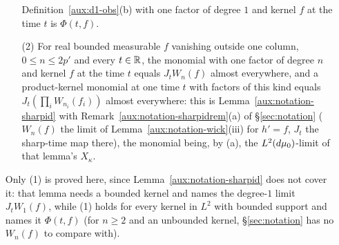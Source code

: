 \begin{auxlemma}
\begin{itemize}
\begin{itemize}
Definition~\ref{aux:d1-obs}(b) with one factor of degree $1$ and kernel $f$ at the time $t$ is
$\Phi(t,f)$.
\item[(2)] For real bounded measurable $f$ vanishing outside one column, $0\le n\le2p'$ and every
$t\in\mathbb{R}$, the monomial with one factor of degree $n$ and kernel $f$ at the time $t$ equals
$J_tW_n(f)$ almost everywhere, and a product-kernel monomial at one time $t$ with factors of
this kind equals $J_t(\prod_iW_{n_i}(f_i))$ almost everywhere: this is
Lemma~\ref{aux:notation-sharpid} with Remark~\ref{aux:notation-sharpidrem}(a) of
\S\ref{sec:notation} ($W_n(f)$ the limit of Lemma~\ref{aux:notation-wick}(iii) for $h'=f$, $J_t$
the sharp-time map there), the monomial being, by (a), the $L^2(d\mu_0)$-limit of that lemma's
$X_\kappa$.
\end{itemize}
Only (1) is proved here, since Lemma~\ref{aux:notation-sharpid} does not cover it: that lemma
needs a bounded kernel and names the degree-$1$ limit $J_tW_1(f)$, while (1) holds for every
kernel in $L^2$ with bounded support and names it $\Phi(t,f)$ (for $n\ge2$ and an unbounded
kernel, \S\ref{sec:notation} has no $W_n(f)$ to compare with).
\end{itemize}
\end{auxlemma}

